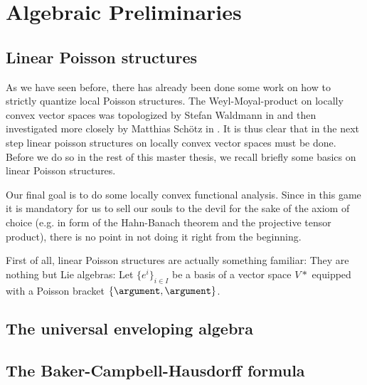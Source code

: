 
%
%

\chapter{Algebraic Preliminaries}


\section{Linear Poisson structures}
\label{sec:chap3_LinearPoisson}

As we have seen before, there has already been done some work on how to strictly 
quantize local Poisson structures. The Weyl-Moyal-product on locally convex vector 
spaces was topologized by Stefan Waldmann in \cite{w_nuc} and then investigated more 
closely by Matthias Schötz in \cite{Schoetz}. It is thus clear that in the next step 
linear poisson structures on locally convex vector spaces must be done. Before we do 
so in the rest of this master thesis, we recall briefly some basics on linear Poisson 
structures.


\begin{remark}
	Our final goal is to  do some locally convex functional analysis. Since in this 
	game it is mandatory for us to sell our souls to the devil for the sake of the 
	axiom of choice (e.g. in form of the Hahn-Banach theorem and the projective tensor 
	product), there is no point in not doing it right from the beginning.
\end{remark}
First of all, linear Poisson structures are actually something familiar: They are nothing but Lie algebras: Let $\{e^i\}_{i \in I}$ be a basis of a vector space $V*$ equipped with a Poisson bracket $\{\argument , \argument \}$.



\section{The universal enveloping algebra}
\label{sec:chap3_UniversalEnveloping}


\section{The Baker-Campbell-Hausdorff formula}
\label{sec:chap3_BCH}
